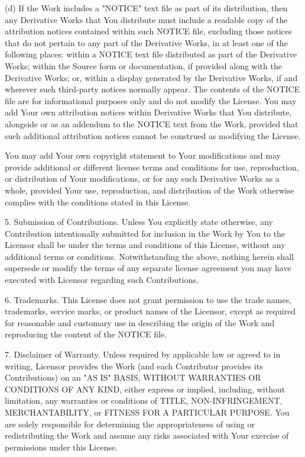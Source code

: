 \documentclass[twoside]{tceusermanual}
\begin{document}
      (d) If the Work includes a "NOTICE" text file as part of its
          distribution, then any Derivative Works that You distribute must
          include a readable copy of the attribution notices contained
          within such NOTICE file, excluding those notices that do not
          pertain to any part of the Derivative Works, in at least one
          of the following places: within a NOTICE text file distributed
          as part of the Derivative Works; within the Source form or
          documentation, if provided along with the Derivative Works; or,
          within a display generated by the Derivative Works, if and
          wherever such third-party notices normally appear. The contents
          of the NOTICE file are for informational purposes only and
          do not modify the License. You may add Your own attribution
          notices within Derivative Works that You distribute, alongside
          or as an addendum to the NOTICE text from the Work, provided
          that such additional attribution notices cannot be construed
          as modifying the License.

      You may add Your own copyright statement to Your modifications and
      may provide additional or different license terms and conditions
      for use, reproduction, or distribution of Your modifications, or
      for any such Derivative Works as a whole, provided Your use,
      reproduction, and distribution of the Work otherwise complies with
      the conditions stated in this License.

   5. Submission of Contributions. Unless You explicitly state otherwise,
      any Contribution intentionally submitted for inclusion in the Work
      by You to the Licensor shall be under the terms and conditions of
      this License, without any additional terms or conditions.
      Notwithstanding the above, nothing herein shall supersede or modify
      the terms of any separate license agreement you may have executed
      with Licensor regarding such Contributions.

   6. Trademarks. This License does not grant permission to use the trade
      names, trademarks, service marks, or product names of the Licensor,
      except as required for reasonable and customary use in describing the
      origin of the Work and reproducing the content of the NOTICE file.

   7. Disclaimer of Warranty. Unless required by applicable law or
      agreed to in writing, Licensor provides the Work (and each
      Contributor provides its Contributions) on an "AS IS" BASIS,
      WITHOUT WARRANTIES OR CONDITIONS OF ANY KIND, either express or
      implied, including, without limitation, any warranties or conditions
      of TITLE, NON-INFRINGEMENT, MERCHANTABILITY, or FITNESS FOR A
      PARTICULAR PURPOSE. You are solely responsible for determining the
      appropriateness of using or redistributing the Work and assume any
      risks associated with Your exercise of permissions under this License.
\end{document}
